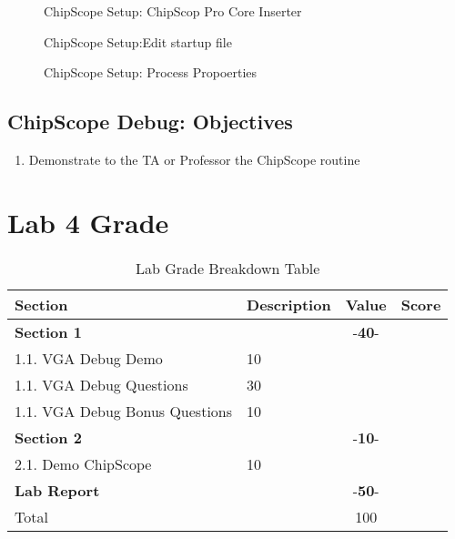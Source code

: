 \documentclass{article}
\begin{document}
\begin{figure}[!htbp]
  \centering
  \caption{ChipScope Setup: ChipScop Pro Core Inserter}
\end{figure}

\begin{figure}[!htbp]
  \centering
  \caption{ChipScope Setup:Edit startup file}
\end{figure}

\begin{figure}[!htbp]
  \centering
  \caption{ChipScope Setup: Process Propoerties}
\end{figure}


\subsection{ChipScope Debug: Objectives}

\begin{enumerate}
  \item Demonstrate to the TA or Professor the ChipScope routine
\end{enumerate}


\newpage
\section{Lab 4 Grade}

\begin{table}[!htb]
  \begin{center}
    \begin{tabular}[width=0.8\textwidth]{|l|l|c|l|}
       \hline
       Section & Description & Value & Score\\
       \hline 
       \multicolumn{2}{|l}{\textbf{Section 1}}  & -\textbf{40}- &\\
       \hline
       1.1. VGA Debug Demo & 10 &\\
       1.1. VGA Debug Questions & 30 &\\
       1.1. VGA Debug Bonus Questions & 10 &\\
       \hline
       \multicolumn{2}{|l}{\textbf{Section 2}}  & -\textbf{10}- &\\
       \hline
       2.1. Demo ChipScope & 10 &\\
       \hline
       \multicolumn{2}{|l}{\textbf{Lab Report}}  & -\textbf{50}- &\\
       \hline
       \hline
       \multicolumn{2}{|l}{Total} & \multicolumn{1}{c|}{100} &\\
       \hline
    \end{tabular}
  \end{center}
  \caption{Lab Grade Breakdown Table}
\end{table}
\end{document}
